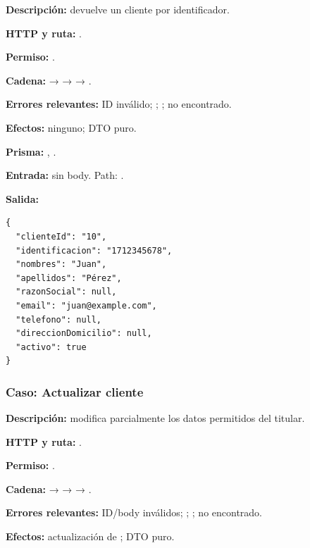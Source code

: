 \textbf{Descripción:} devuelve un cliente por identificador.


\textbf{HTTP y ruta:} \texttt{}.


\textbf{Permiso:} \texttt{}.


\textbf{Cadena:} \texttt{} → \texttt{} → \texttt{} → \texttt{}.


\textbf{Errores relevantes:} \texttt{} ID inválido; \texttt{}; \texttt{}; \texttt{} no encontrado.


\textbf{Efectos:} ninguno; DTO puro.


\textbf{Prisma:} \texttt{}, \texttt{}.


\textbf{Entrada:} sin body. Path: \texttt{}.


\textbf{Salida:}


\begin{lstlisting}
{
  "clienteId": "10",
  "identificacion": "1712345678",
  "nombres": "Juan",
  "apellidos": "Pérez",
  "razonSocial": null,
  "email": "juan@example.com",
  "telefono": null,
  "direccionDomicilio": null,
  "activo": true
}
\end{lstlisting}


\subsubsection{Caso: Actualizar cliente}


\textbf{Descripción:} modifica parcialmente los datos permitidos del titular.


\textbf{HTTP y ruta:} \texttt{}.


\textbf{Permiso:} \texttt{}.


\textbf{Cadena:} \texttt{} → \texttt{} → \texttt{} → \texttt{}.


\textbf{Errores relevantes:} \texttt{} ID/body inválidos; \texttt{}; \texttt{}; \texttt{} no encontrado.


\textbf{Efectos:} actualización de \texttt{}; DTO puro.


